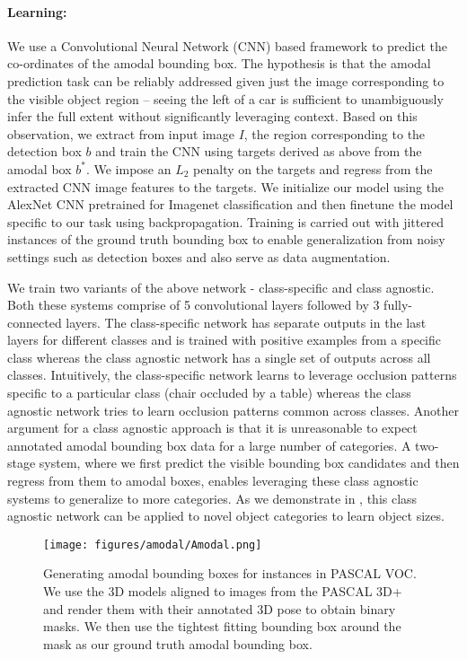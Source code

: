 \paragraph{Learning:} We use a Convolutional Neural Network (CNN) \cite{neocognitron,Lecun89} based framework to predict the co-ordinates of the amodal bounding box. The hypothesis is that the amodal prediction task can be reliably addressed given just the image corresponding to the visible object region -- seeing the left of a car is sufficient to unambiguously infer the full extent without significantly leveraging context. Based on this observation, we extract from input image $I$, the region corresponding to the detection box $b$ and train the CNN using targets derived as above from the amodal box $b^*$. We impose an $L_2$ penalty on the targets and regress from the extracted CNN image features to the targets. We initialize our model using the AlexNet \cite{krizhevsky2012imagenet} CNN pretrained for Imagenet \cite{imagenet_cvpr09} classification and then finetune the model specific to our task using backpropagation. Training is carried out with jittered instances of the ground truth bounding box to enable generalization from noisy settings such as detection boxes and also serve as data augmentation.

We train two variants of the above network - class-specific and class agnostic. Both these systems comprise of 5 convolutional layers followed by 3 fully-connected layers. The class-specific network has separate outputs in the last layers for different classes and is trained with positive examples from a specific class whereas the class agnostic network has a single set of outputs across all classes. Intuitively, the class-specific network learns to leverage occlusion patterns specific to a particular class (\eg chair occluded by a table) whereas the class agnostic network tries to learn occlusion patterns common across classes. Another argument for a class agnostic approach is that it is unreasonable to expect annotated amodal bounding box data for a large number of categories. A two-stage system, where we first predict the visible bounding box candidates and then regress from them to amodal boxes, enables leveraging these class agnostic systems to generalize to more categories. As we demonstrate in , this class agnostic network can be applied to novel object categories to learn object sizes.

\begin{figure}
  \centering
  \texttt{[image: figures/amodal/Amodal.png]}
  \caption{ Generating amodal bounding boxes for instances in PASCAL VOC. We use the 3D models aligned to images from the PASCAL 3D+ \cite{pascal3d} and render them with their annotated 3D pose to obtain binary masks. We then use the tightest fitting bounding box around the mask as our ground truth amodal bounding box.}
\end{figure}

